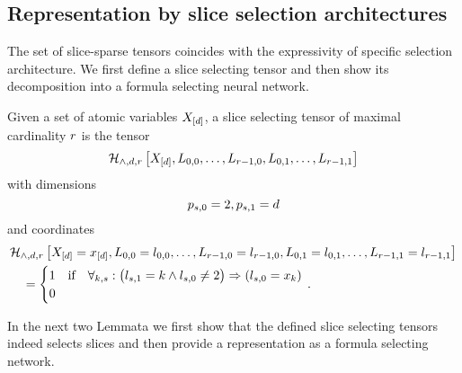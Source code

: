 %







\subsection{Representation by slice selection architectures}

The set of slice-sparse tensors coincides with the expressivity of specific selection architecture.
We first define a slice selecting tensor and then show its decomposition into a formula selecting neural network.

\begin{definition}
	Given a set of atomic variables $X_{[d]}$, a slice selecting tensor of maximal cardinality $r$ is the tensor
		\[ \mathcal{H}_{\land,d,r}\left[X_{[d]},L_{0,0},\ldots,L_{r-1,0},L_{0,1},\ldots,L_{r-1,1}\right] \]
	with dimensions
		\[ p_{s,0} = 2, p_{s,1} = d \]
	and coordinates
	\begin{align*}
		& \mathcal{H}_{\land,d,r}\left[X_{[d]}=x_{[d]},L_{0,0}=l_{0,0},\ldots,L_{r-1,0}=l_{r-1,0},L_{0,1}=l_{0,1},\ldots,L_{r-1,1}=l_{r-1,1}\right] \\
		& \quad = \begin{cases}
			1 & \text{if} \quad 
			\forall_{k,s} : \big(  l_{s,1} = k \land l_{s,0} \neq 2 \big) \Rightarrow  (l_{s,0} = x_{k})  \\
			0
		\end{cases} \, . 
	\end{align*}
\end{definition}

In the next two Lemmata we first show that the defined slice selecting tensors indeed selects slices and then provide a representation as a formula selecting network.

